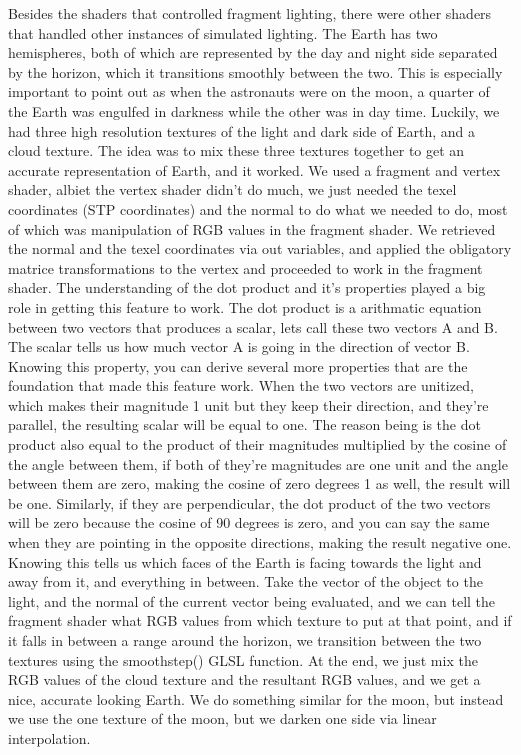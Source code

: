 \documentclass[onecolumn, draftclsnofoot,10pt, compsoc]{IEEEtran}
\begin{document}
Besides the shaders that controlled fragment lighting, there were other shaders that handled other instances of simulated lighting. The Earth has two hemispheres, both of which are represented by the day and night side separated by the horizon, which it transitions smoothly between the two. This is especially important to point out as when the astronauts were on the moon, a quarter of the Earth was engulfed in darkness while the other was in day time. Luckily, we had three high resolution textures of the light and dark side of Earth, and a cloud texture. The idea was to mix these three textures together to get an accurate representation of Earth, and it worked. We used a fragment and vertex shader, albiet the vertex shader didn't do much, we just needed the texel coordinates (STP coordinates) and the normal to do what we needed to do, most of which was manipulation of RGB values in the fragment shader. We retrieved the normal and the texel coordinates via out variables, and applied the obligatory matrice transformations to the vertex and proceeded to work in the fragment shader. The understanding of the dot product and it's properties played a big role in getting this feature to work. The dot product is a arithmatic equation between two vectors that produces a scalar, lets call these two vectors A and B. The scalar tells us how much vector A is going in the direction of vector B. Knowing this property, you can derive several more properties that are the foundation that made this feature work. When the two vectors are unitized, which makes their magnitude 1 unit but they keep their direction, and they're parallel, the resulting scalar will be equal to one. The reason being is the dot product also equal to the product of their magnitudes multiplied by the cosine of the angle between them, if both of they're magnitudes are one unit and the angle between them are zero, making the cosine of zero degrees 1 as well, the result will be one. Similarly, if they are perpendicular, the dot product of the two vectors will be zero because the cosine of 90 degrees is zero, and you can say the same when they are pointing in the opposite directions, making the result negative one. Knowing this tells us which faces of the Earth is facing towards the light and away from it, and everything in between. Take the vector of the object to the light, and the normal of the current vector being evaluated, and we can tell the fragment shader what RGB values from which texture to put at that point, and if it falls in between a range around the horizon, we transition between the two textures using the smoothstep() GLSL function. At the end, we just mix the RGB values of the cloud texture and the resultant RGB values, and we get a nice, accurate looking Earth. We do something similar for the moon, but instead we use the one texture of the moon, but we darken one side via linear interpolation. 
\end{document}
